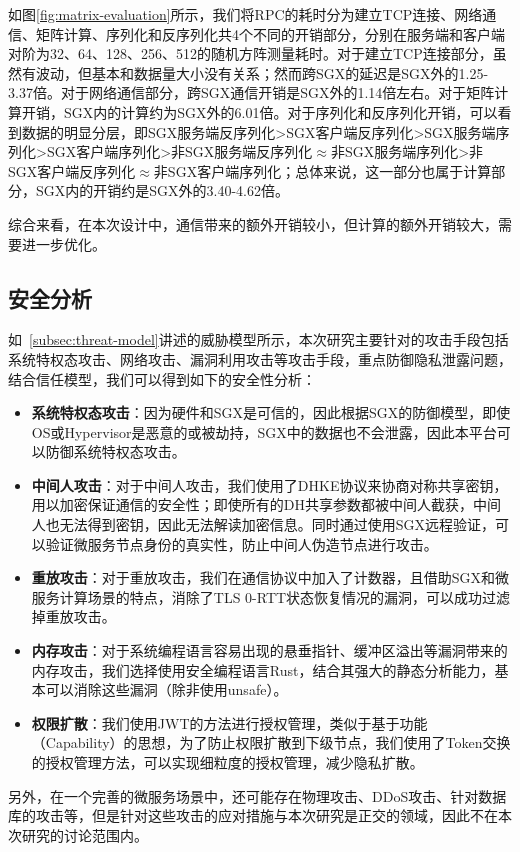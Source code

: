 如图\ref{fig:matrix-evaluation}所示，我们将RPC的耗时分为建立TCP连接、网络通信、矩阵计算、序列化和反序列化共4个不同的开销部分，分别在服务端和客户端对阶为32、64、128、256、512的随机方阵测量耗时。对于建立TCP连接部分，虽然有波动，但基本和数据量大小没有关系；然而跨SGX的延迟是SGX外的1.25-3.37倍。对于网络通信部分，跨SGX通信开销是SGX外的1.14倍左右。对于矩阵计算开销，SGX内的计算约为SGX外的6.01倍。对于序列化和反序列化开销，可以看到数据的明显分层，即SGX服务端反序列化>SGX客户端反序列化>SGX服务端序列化>SGX客户端序列化>非SGX服务端反序列化$\approx$非SGX服务端序列化>非SGX客户端反序列化$\approx$非SGX客户端序列化；总体来说，这一部分也属于计算部分，SGX内的开销约是SGX外的3.40-4.62倍。

综合来看，在本次设计中，通信带来的额外开销较小，但计算的额外开销较大，需要进一步优化。

\subsection{安全分析}

如~\cref{subsec:threat-model}讲述的威胁模型所示，本次研究主要针对的攻击手段包括系统特权态攻击、网络攻击、漏洞利用攻击等攻击手段，重点防御隐私泄露问题，结合信任模型，我们可以得到如下的安全性分析：

\begin{itemize}
    \item \textbf{系统特权态攻击}：因为硬件和SGX是可信的，因此根据SGX的防御模型，即使OS或Hypervisor是恶意的或被劫持，SGX中的数据也不会泄露，因此本平台可以防御系统特权态攻击。
    \item \textbf{中间人攻击}：对于中间人攻击，我们使用了DHKE协议来协商对称共享密钥，用以加密保证通信的安全性；即使所有的DH共享参数都被中间人截获，中间人也无法得到密钥，因此无法解读加密信息。同时通过使用SGX远程验证，可以验证微服务节点身份的真实性，防止中间人伪造节点进行攻击。
    \item \textbf{重放攻击}：对于重放攻击，我们在通信协议中加入了计数器，且借助SGX和微服务计算场景的特点，消除了TLS 0-RTT状态恢复情况的漏洞，可以成功过滤掉重放攻击。
    \item \textbf{内存攻击}：对于系统编程语言容易出现的悬垂指针、缓冲区溢出等漏洞带来的内存攻击，我们选择使用安全编程语言Rust，结合其强大的静态分析能力，基本可以消除这些漏洞（除非使用unsafe）。
    \item \textbf{权限扩散}：我们使用JWT的方法进行授权管理，类似于基于功能（Capability）的思想，为了防止权限扩散到下级节点，我们使用了Token交换的授权管理方法，可以实现细粒度的授权管理，减少隐私扩散。
\end{itemize}

另外，在一个完善的微服务场景中，还可能存在物理攻击、DDoS攻击、针对数据库的攻击等，但是针对这些攻击的应对措施与本次研究是正交的领域，因此不在本次研究的讨论范围内。
